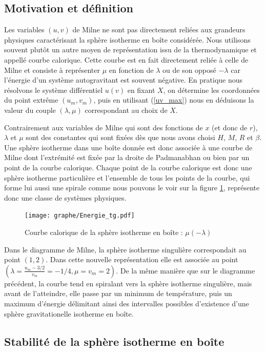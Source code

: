 \subsection{Motivation et définition}
	
	Les variables $(u,v)$ de Milne ne sont pas directement reliées aux grandeurs physiques caractérisant la sphère
	isotherme en boîte considérée. Nous utilisons souvent plutôt un autre moyen de représentation issu de la
	thermodynamique et appellé courbe calorique. Cette courbe est en fait directement reliée à celle de Milne et
	consiste à représenter $\mu$ en fonction de $\lambda$ ou de son opposé $-\lambda$ car l'énergie d'un système
	autogravitant est souvent négative. En pratique nous résolvons le système différentiel $u(v)$ en fixant $X$, on
	détermine les coordonnées du point extrême $(u_m,v_m)$, puis en utilisant (\ref{uv_max}) nous en déduisons la valeur
	du couple $(\lambda,\mu)$ correspondant au choix de $X$.
	
	Contrairement aux variables de Milne qui sont des fonctions de $x$ (et donc de $r$), $\lambda$ et $\mu$ sont des
	constantes qui sont fixées dès que nous avons choisi $H$, $M$, $R$ et $\beta$. Une sphère isotherme dans une boîte
	donnée est donc associée à une courbe de Milne dont l'extrémité est fixée par la droite de Padmanabhan ou bien
	par un point de la courbe calorique. Chaque point de la courbe calorique est donc une sphère isotherme
	particulière et l'ensemble de tous les points de la courbe, qui forme lui aussi une spirale comme nous pouvons le
	voir sur la figure \ref{Ener}, représente donc une classe de systèmes physiques.
	
	\begin{figure}[h!]
		\centering \texttt{[image: graphe/Energie\_tg.pdf]}
		\caption{Courbe calorique de la sphère isotherme en boîte : $\mu(-\lambda)$}
		\label{Ener}
	\end{figure}

	Dans le diagramme de Milne, la sphère isotherme singulière correspondait au point $\left(1,2\right)$.
	Dans cette nouvelle représentation elle est associée au point $\left(\lambda = \frac{u_m - 3/2}{v_m} = -1/4, \mu = v_m = 2\right)$.
	De la même manière que sur le diagramme précédent, la courbe tend en spiralant vers la sphère isotherme singulière, mais avant de l'atteindre,
	elle passe par un minimum de température, puis un maximum d'énergie délimitant ainsi des intervalles possibles d'existence d'une sphère gravitationelle isotherme en boîte.

\subsection{Stabilité de la sphère isotherme en boîte}
